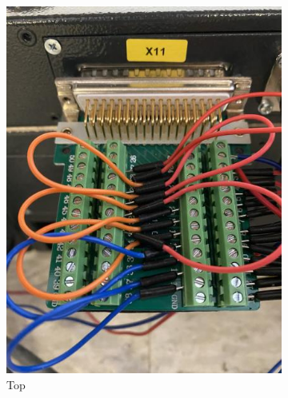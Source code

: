 \documentclass[12pt, letterpaper]{article}
\begin{document}
\begin{figure}
    \begin{subfigure}[b]{0.32\textwidth}
        \centering
        \includegraphics[width=\textwidth]{Images/IMG_1577.jpg}
        \caption{Top}
        \label{fig:safcc}
    \end{subfigure}
    \hfill
    \begin{subfigure}[b]{0.32\textwidth}
        \centering

\end{subfigure}
\end{figure}
\end{document}
